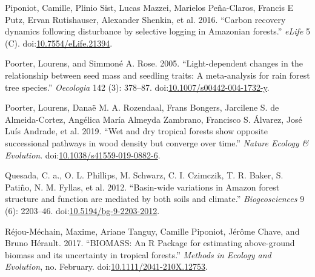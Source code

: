 \documentclass[]{elsarticle} %
\begin{document}
\hypertarget{ref-Piponiot2016a}{}
Piponiot, Camille, Plinio Sist, Lucas Mazzei, Marielos Peña-Claros,
Francis E Putz, Ervan Rutishauser, Alexander Shenkin, et al. 2016.
``Carbon recovery dynamics following disturbance by selective logging in
Amazonian forests.'' \emph{eLife} 5 (C).
doi:\href{https://doi.org/10.7554/eLife.21394}{10.7554/eLife.21394}.

\hypertarget{ref-Poorter2005a}{}
Poorter, Lourens, and Simmoné A. Rose. 2005. ``Light-dependent changes
in the relationship between seed mass and seedling traits: A
meta-analysis for rain forest tree species.'' \emph{Oecologia} 142 (3):
378--87.
doi:\href{https://doi.org/10.1007/s00442-004-1732-y}{10.1007/s00442-004-1732-y}.

\hypertarget{ref-Poorter2019}{}
Poorter, Lourens, Danaë M. A. Rozendaal, Frans Bongers, Jarcilene S. de
Almeida-Cortez, Angélica María Almeyda Zambrano, Francisco S. Álvarez,
José Luís Andrade, et al. 2019. ``Wet and dry tropical forests show
opposite successional pathways in wood density but converge over time.''
\emph{Nature Ecology \& Evolution}.
doi:\href{https://doi.org/10.1038/s41559-019-0882-6}{10.1038/s41559-019-0882-6}.

\hypertarget{ref-Quesada2012}{}
Quesada, C. a., O. L. Phillips, M. Schwarz, C. I. Czimczik, T. R. Baker,
S. Patiño, N. M. Fyllas, et al. 2012. ``Basin-wide variations in Amazon
forest structure and function are mediated by both soils and climate.''
\emph{Biogeosciences} 9 (6): 2203--46.
doi:\href{https://doi.org/10.5194/bg-9-2203-2012}{10.5194/bg-9-2203-2012}.

\hypertarget{ref-Rejou-Mechain2017}{}
Réjou-Méchain, Maxime, Ariane Tanguy, Camille Piponiot, Jérôme Chave,
and Bruno Hérault. 2017. ``BIOMASS: An R Package for estimating
above-ground biomass and its uncertainty in tropical forests.''
\emph{Methods in Ecology and Evolution}, no. February.
doi:\href{https://doi.org/10.1111/2041-210X.12753}{10.1111/2041-210X.12753}.
\end{document}
